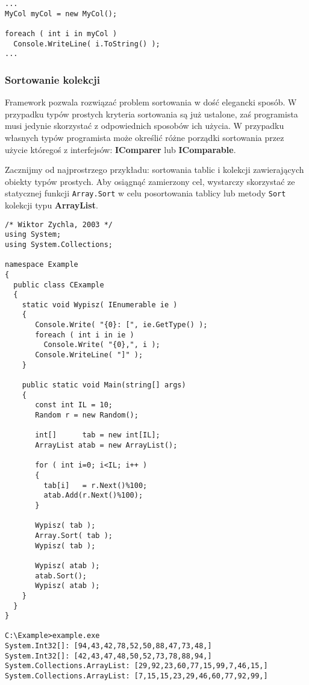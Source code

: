 \begin{scriptsize}
\begin{verbatim}
...
MyCol myCol = new MyCol();

foreach ( int i in myCol )
  Console.WriteLine( i.ToString() );
...
\end{verbatim}
\end{scriptsize}

\subsubsection{Sortowanie kolekcji}

Framework pozwala rozwiązać problem sortowania w dość elegancki sposób. W przypadku typów prostych
kryteria sortowania są już ustalone, zaś programista musi jedynie skorzystać z odpowiednich sposobów ich
użycia. W przypadku własnych typów programista może określić różne porządki sortowania przez użycie
któregoś z interfejsów: {\bf IComparer} lub {\bf IComparable}.

Zacznijmy od najprostrzego przykładu: sortowania tablic i kolekcji zawierających obiekty typów 
prostych. Aby osiągnąć zamierzony cel, wystarczy skorzystać ze statycznej funkcji {\tt Array.Sort} w celu
posortowania tablicy lub metody {\tt Sort} kolekcji typu {\bf ArrayList}.

\begin{scriptsize}
\begin{verbatim}
/* Wiktor Zychla, 2003 */
using System;
using System.Collections;

namespace Example
{
  public class CExample 
  {
    static void Wypisz( IEnumerable ie )
    {
       Console.Write( "{0}: [", ie.GetType() );
       foreach ( int i in ie )
         Console.Write( "{0},", i );
       Console.WriteLine( "]" );
    }

    public static void Main(string[] args)
    {
       const int IL = 10;
       Random r = new Random();

       int[]      tab = new int[IL];
       ArrayList atab = new ArrayList();		

       for ( int i=0; i<IL; i++ )
       {
         tab[i]   = r.Next()%100;
         atab.Add(r.Next()%100);
       }

       Wypisz( tab ); 
       Array.Sort( tab );
       Wypisz( tab );  

       Wypisz( atab );
       atab.Sort();
       Wypisz( atab );
    }
  }
}

C:\Example>example.exe
System.Int32[]: [94,43,42,78,52,50,88,47,73,48,]
System.Int32[]: [42,43,47,48,50,52,73,78,88,94,]
System.Collections.ArrayList: [29,92,23,60,77,15,99,7,46,15,]
System.Collections.ArrayList: [7,15,15,23,29,46,60,77,92,99,]
\end{verbatim}
\end{scriptsize}

